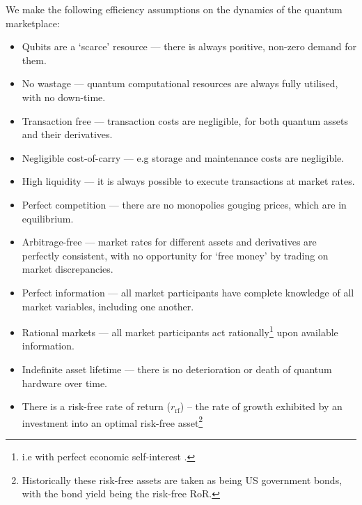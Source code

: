 \begin{postulate}\label{post:market_eff} We make the following efficiency assumptions on the dynamics of the quantum marketplace:
\begin{itemize}
	\item Qubits are a `scarce' resource --- there is always positive, non-zero demand for them.
	\item No wastage --- quantum computational resources are always fully utilised, with no down-time.
	\item Transaction free --- transaction costs are negligible, for both quantum assets and their derivatives.
	\item Negligible cost-of-carry --- e.g storage and maintenance costs are negligible.
	\item High liquidity --- it is always possible to execute transactions at market rates.
	\item Perfect competition --- there are no monopolies gouging prices, which are in equilibrium.
	\item Arbitrage-free --- market rates for different assets and derivatives are perfectly consistent, with no opportunity for `free money' by trading on market discrepancies.
	\item Perfect information --- all market participants have complete knowledge of all market variables, including one another.
	\item Rational markets --- all market participants act rationally\footnote{i.e with perfect economic self-interest .} upon available information.
	\item Indefinite asset lifetime --- there is no deterioration or death of quantum hardware over time.
	\item There is a risk-free rate of return ($r_\mathrm{rf}$)
-- the rate of growth exhibited by an investment into an optimal risk-free asset\footnote{Historically these risk-free assets are taken as being US government bonds, with the bond yield being the risk-free RoR.}
	\end{itemize}
\end{postulate}

%
%

